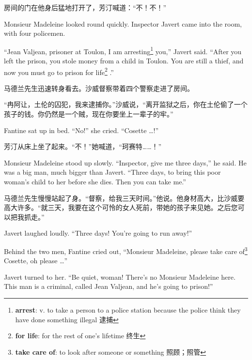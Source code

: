 \documentclass[fontset=ubuntu, zihao=5]{ctexart}
\begin{document}
\begin{paracol}{2}
  \switchcolumn

  房间的门在他身后猛地打开了，芳汀喊道：“不！不！”

  \switchcolumn*

  Monsieur Madeleine looked round quickly. Inspector Javert came into the room, with four policemen.


  ``Jean Valjean, prisoner at Toulon, I am arresting\footnote{\textbf{arrest}:  v. to take a person to a police station because the police think they have done something illegal 逮捕}
  you,'' Javert said. ``After you left the prison, you stole money from a child in Toulon. You are still a thief, and now you must go to prison for life\footnote{\textbf{for life}: for the rest of one's lifetime 终生}
  .''

  \switchcolumn

  马德兰先生迅速转身看去。沙威督察带着四个警察走进了房间。


  “冉阿让，土伦的囚犯，我来逮捕你。”沙威说，“离开监狱之后，你在土伦偷了一个孩子的钱。你仍然是一个贼，现在你要坐上一辈子的牢。”

  \switchcolumn*

  Fantine sat up in bed. ``No!'' she cried. ``Cosette \ldots{}!''

  \switchcolumn

  芳汀从床上坐了起来。“不！”她喊道，“珂赛特……！”

  \switchcolumn*

  Monsieur Madeleine stood up slowly. ``Inspector, give me three days,'' he said. He was a big man, much bigger than Javert. ``Three days, to bring this poor woman's child to her before she dies. Then you can take me.''

  \switchcolumn

  马德兰先生慢慢站起了身。“督察，给我三天时间。”他说。他身材高大，比沙威要高大许多。“就三天，我要在这个可怜的女人死前，带她的孩子来见她。之后您可以把我抓走。”

  \switchcolumn*

  Javert laughed loudly. ``Three days! You're going to run away!''

  Behind the two men, Fantine cried out, ``Monsieur Madeleine, please take
  care of\footnote{\textbf{take care of}: to look after someone or something
    照顾；照管} Cosette, oh please \ldots{}''

  Javert turned to her. ``Be quiet, woman! There's no Monsieur Madeleine here. This man is a criminal, called Jean Valjean, and he's going to prison!''


\end{paracol}
\end{document}
